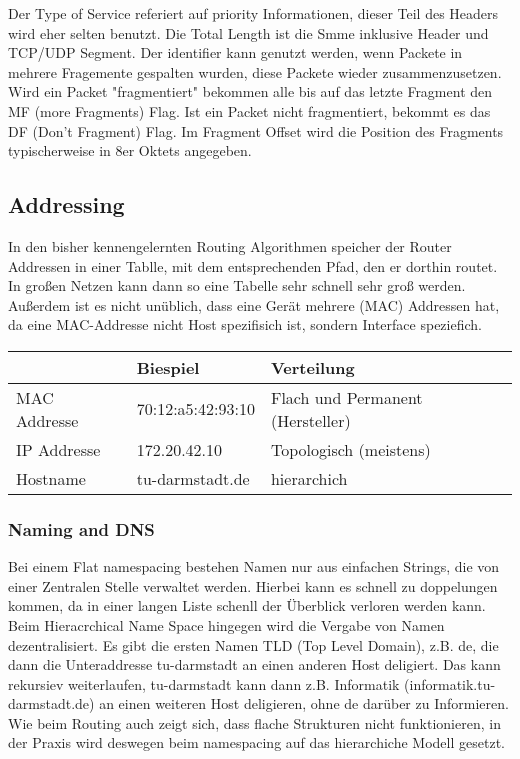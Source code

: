         Der Type of Service referiert auf priority Informationen, dieser Teil des Headers wird eher selten benutzt. Die Total Length ist die Smme inklusive Header und TCP/UDP Segment. Der identifier kann genutzt werden, wenn Packete in mehrere Fragemente gespalten wurden, diese Packete wieder zusammenzusetzen. Wird ein Packet "fragmentiert" bekommen alle bis auf das letzte Fragment den MF (more Fragments) Flag. Ist ein Packet nicht fragmentiert, bekommt es das DF (Don't Fragment) Flag. Im Fragment Offset wird die Position des Fragments typischerweise in 8er Oktets angegeben. 

    \subsection{Addressing}
        In den bisher kennengelernten Routing Algorithmen speicher der Router Addressen in einer Tablle, mit dem entsprechenden Pfad, den er dorthin routet. In großen Netzen kann dann so eine Tabelle sehr schnell sehr groß werden. Außerdem ist es nicht unüblich, dass eine Gerät mehrere (MAC) Addressen hat, da eine MAC-Addresse nicht Host spezifisich ist, sondern Interface speziefich. 
        
        \begin{table}[h]
            \centering
            \begin{tabular}{|l|l|l|}
                \hline
                         & Biespiel          & Verteilung                       \\ \hline \hline
            MAC Addresse & 70:12:a5:42:93:10 & Flach und Permanent (Hersteller) \\ \hline
            IP Addresse  & 172.20.42.10      & Topologisch (meistens)           \\ \hline
            Hostname     & tu-darmstadt.de   & hierarchich                     \\ \hline
            \end{tabular}
        \end{table}

        \subsubsection{Naming and DNS}
            Bei einem Flat namespacing bestehen Namen nur aus einfachen Strings, die von einer Zentralen Stelle verwaltet werden. Hierbei kann es schnell zu doppelungen kommen, da in einer langen Liste schenll der Überblick verloren werden kann. \\
            Beim Hieracrchical Name Space hingegen wird die Vergabe von Namen dezentralisiert. Es gibt die ersten Namen TLD (Top Level Domain), z.B. de, die dann die Unteraddresse tu-darmstadt an einen anderen Host deligiert. Das kann rekursiev weiterlaufen, tu-darmstadt kann dann z.B. Informatik (informatik.tu-darmstadt.de) an einen weiteren Host deligieren, ohne de darüber zu Informieren. Wie beim Routing auch zeigt sich, dass flache Strukturen nicht funktionieren, in der Praxis wird deswegen beim namespacing auf das hierarchiche Modell gesetzt. 

